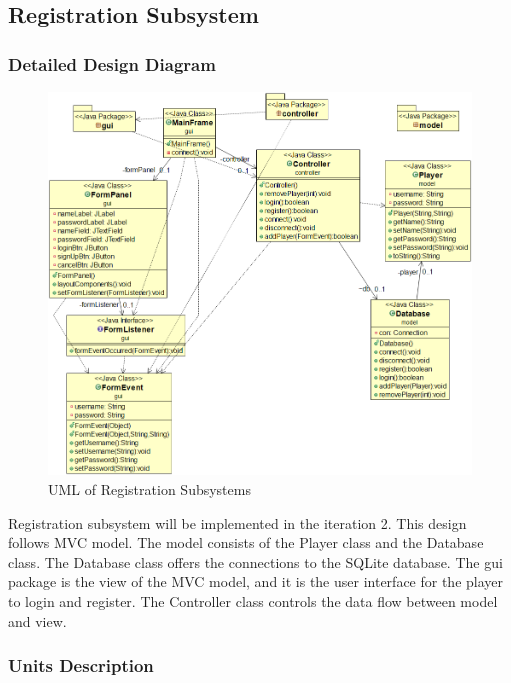 \documentclass[12pt]{article}
\begin{document}
\newpage

\subsection{Registration Subsystem}

\subsubsection{Detailed Design Diagram}

\begin{figure}[htbp]
    \includegraphics[width=1\textwidth]{images/Registration_UML.png}
    \caption{UML of Registration Subsystems}
    \label{fig:Registration_UML}
\end{figure}

Registration subsystem will be implemented in the iteration 2. This design follows MVC model. The model consists of the Player class and the Database class. The Database class offers the connections to the SQLite database. The gui package is the view of the MVC model, and it is the user interface for the player to login and register. The Controller class controls the data flow between model and view.

\subsubsection{Units Description}
\end{document}
